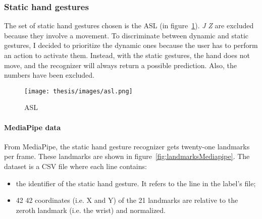 \documentclass[../thesis.tex]{subfiles}
\begin{document}
\subsubsection{Static hand gestures}
The set of static hand gestures chosen is the \gls{ASL} (in figure~\ref{fig:asl}). \textit{J} \textit{Z} are excluded because they involve a movement. To discriminate between dynamic and static gestures, I decided to prioritize the dynamic ones because the user has to perform an action to activate them. Instead, with the static gestures, the hand does not move, and the recognizer will always return a possible prediction. Also, the numbers have been excluded. 

\begin{figure}[H]
    \centering
    \texttt{[image: thesis/images/asl.png]}
    \caption{\glsdesc{ASL}~\parencite{img:asl}}\label{fig:asl}
\end{figure}

\paragraph{MediaPipe data}
From MediaPipe, the static hand gesture recognizer gets twenty-one landmarks per frame. These landmarks are shown in figure~\ref{fig:landmarksMediapipe}. The dataset is a CSV file where each line contains:
\begin{itemize}
    \item the identifier of the static hand gesture. It refers to the line in the label’s file; 
    \item 42 42 coordinates (i.e. X and Y) of the 21 landmarks are relative to the zeroth landmark (i.e. the wrist) and normalized. 
\end{itemize}
\end{document}
